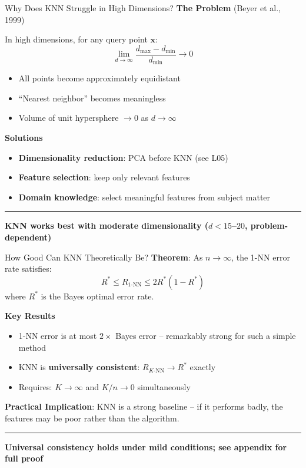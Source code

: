 \documentclass[8pt,aspectratio=169]{beamer}
\newcommand{\bottomnote}[1]{%
\vfill
\vspace{-2mm}
\textcolor{mllavender2}{\rule{\textwidth}{0.4pt}}
\vspace{1mm}
\footnotesize
\textbf{#1}
}
\begin{document}
\begin{frame}[t]{Why Does KNN Struggle in High Dimensions?}
\textbf{The Problem} (Beyer et al., 1999)

In high dimensions, for any query point $\mathbf{x}$:
$$\lim_{d \to \infty} \frac{d_{\max} - d_{\min}}{d_{\min}} \to 0$$
\begin{itemize}
\item All points become approximately equidistant
\item ``Nearest neighbor'' becomes meaningless
\item Volume of unit hypersphere $\to 0$ as $d \to \infty$
\end{itemize}
\vspace{0.5em}
\textbf{Solutions}
\begin{itemize}
\item \textbf{Dimensionality reduction}: PCA before KNN (see L05)
\item \textbf{Feature selection}: keep only relevant features
\item \textbf{Domain knowledge}: select meaningful features from subject matter
\end{itemize}
\bottomnote{KNN works best with moderate dimensionality ($d < 15$--$20$, problem-dependent)}
\end{frame}

\begin{frame}[t]{How Good Can KNN Theoretically Be?}
\textbf{Theorem}: As $n \to \infty$, the 1-NN error rate satisfies:
$$R^* \leq R_{1\text{-NN}} \leq 2R^*(1 - R^*)$$
where $R^*$ is the Bayes optimal error rate.
\vspace{0.5em}

\textbf{Key Results}
\begin{itemize}
\item 1-NN error is at most $2\times$ Bayes error -- remarkably strong for such a simple method
\item KNN is \textbf{universally consistent}: $R_{K\text{-NN}} \to R^*$ exactly
\item Requires: $K \to \infty$ and $K/n \to 0$ simultaneously
\end{itemize}
\vspace{0.3em}
\textbf{Practical Implication}: KNN is a strong baseline -- if it performs badly, the features may be poor rather than the algorithm.
\bottomnote{Universal consistency holds under mild conditions; see appendix for full proof}
\end{frame}
\end{document}
